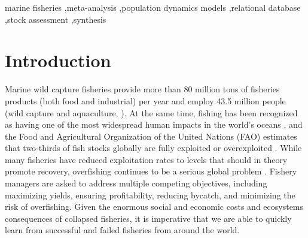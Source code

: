 \documentclass[letterpaper,review,authoryear,12pt]{elsarticle}
\begin{document}
\begin{frontmatter}
\address[dal]{Department of Biology, Dalhousie University, Halifax, NS B3H 4J1, Canada}
\address[scripps]{Scripps Institution of Oceanography, UCSD, 9500 Gilman Drive, La Jolla, CA 92093-0202, USA}
\address[uw]{School of Aquatic and Fishery Sciences, University of Washington, Seattle, WA  98195-5020, USA}

\begin{abstract}


\end{abstract}

\begin{keyword}
marine fisheries \sep meta-analysis \sep population dynamics models \sep relational database \sep stock assessment \sep synthesis
\end{keyword}

\end{frontmatter}





\section*{Introduction}

Marine wild capture fisheries provide more than 80 million tons of
fisheries products (both food and industrial) per year and employ 43.5
million people (wild capture and aquaculture, \citep{FAO:sofia}).
At the same time, fishing has been recognized as having one of the
most widespread human impacts in the world's oceans
\citep{Halpern:etal:2008:science}, and the Food and Agricultural
Organization of the United Nations (FAO) estimates that two-thirds of
fish stocks globally are fully exploited or overexploited
\citep{FAO:sofia}.  While many fisheries have reduced exploitation
rates to levels that should in theory promote recovery, overfishing continues to
be a serious global problem \citep{Worm:etal:2009:science}.  Fishery
managers are asked to address multiple competing objectives, including
maximizing yields, ensuring profitability, reducing bycatch, and
minimizing the risk of overfishing.  Given the enormous social and
economic costs \citep{Rice:etal:2003:icescm} and ecosystems
consequences \citep{Frank:etal:2005:science, Myers:etal:2007:science}
of collapsed fisheries, it is imperative that we are able to quickly
learn from successful and failed fisheries from around the world.
\end{document}
